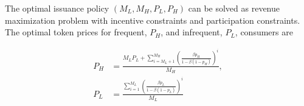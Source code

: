 The optimal issuance policy $(M_L, M_H, P_L, P_H )$ can be solved as revenue maximization problem with incentive constraints and participation constraints.  The optimal token prices for frequent, $P_H$, and infrequent, $P_L$, consumers are

\begin{align}
    P_{H} &= \frac{M_{L}P_{L}+\sum_{i=M_{L}+1}^{M_{H}}(\frac{\beta p_{H}}{1-\beta(1-p_{H})})^{i}}{M_{H}},\\
    P_{L} &= \frac{\sum_{i=1}^{M_{L}}(\frac{\beta p_{L}}{1-\beta(1-p_{L})})^{i}}{M_{L}}
\end{align}
